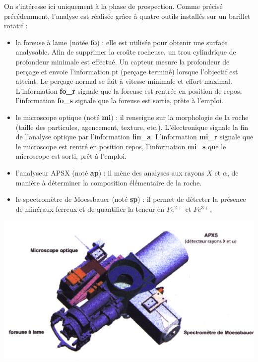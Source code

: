 \documentclass[10pt,fleqn]{article} %
\begin{document}
\begin{multicols}{2}
\begin{multicols}{2}
On s’intéresse ici uniquement à la phase de prospection. Comme précisé précédemment, l’analyse est réalisée grâce à quatre outils installés sur un barillet rotatif :
\begin{itemize}
\item la foreuse à lame (notée \textbf{fo}) : elle est utilisée pour obtenir une surface analysable. Afin de supprimer la croûte rocheuse, un trou cylindrique de profondeur minimale est effectué. Un capteur mesure la profondeur de perçage et envoie l’information pt (perçage terminé) lorsque l’objectif est atteint. Le perçage normal se fait à vitesse minimale et effort maximal. L’information \textbf{fo\_r} signale que la foreuse est rentrée en position de repos, l’information \textbf{fo\_s} signale que la foreuse est sortie, prête à l’emploi.
\item le microscope optique (noté \textbf{mi}) : il renseigne sur la morphologie de la roche (taille des particules, agencement, texture, etc.). L’électronique signale la fin de l’analyse optique par l’information \textbf{fin\_a}. L’information \textbf{mi\_r} signale que le microscope est rentré en position repos, l’information \textbf{mi\_s} que le microscope est sorti, prêt à l’emploi.
\item l’analyseur APSX (noté \textbf{ap}) : il mène des analyses aux rayons $X$ et $\alpha$, de manière à déterminer la composition élémentaire de la roche.
\item le spectromètre de Moessbauer (noté \textbf{sp}) : il permet de détecter la présence de minéraux ferreux et de quantifier la teneur en $Fe^{2+}$ et $Fe^{3+}$.
\end{itemize}


\begin{center}
\includegraphics[width=\linewidth]{images/fig_05.png}
\end{center}


\end{multicols}
\end{multicols}
\end{document}
